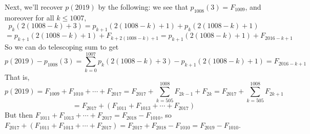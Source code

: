 \documentclass[11pt,a4paper]{article}
\newcommand{\<}{\langle}
\renewcommand{\>}{\rangle}
\begin{document}
\begin{enumerate}
	Next, we'll recover $p(2019)$ by the following: we see that $p_{1008}(3)=F_{1009}$, and moreover for all $k\le 1007$, 
	\[
	p_k(2(1008-k)+3) = p_{k+1}(2(1008-k)+1)+p_k(2(1008-k)+1)
	\]\[
	=p_{k+1}(2(1008-k)+1)+F_{k+2(1008-k)+1}
	=p_{k+1}(2(1008-k)+1)+F_{2016-k+1}
	\]
	So we can do telescoping sum to get 
	\[
	p(2019)-p_{1008}(3)
	=\sum_{k=0}^{1007} p_k(2(1008-k)+3)-p_{k+1}(2(1008-k)+1)
	=F_{2016-k+1}
	\]
	That is, 
	\[
	p(2019)=F_{1009}+F_{1010}+\cdots + F_{2017}
	=F_{2017}+\sum_{k=505}^{1008}F_{2k-1}+F_{2k}
	=F_{2017}+\sum_{k=505}^{1008}F_{2k+1}
	\]\[
	=F_{2017}+(F_{1011}+F_{1013}+\cdots + F_{2017})
	\]
	But then $F_{1011}+F_{1013}+\cdots + F_{2017}=F_{2018}-F_{1010}$, so 
	$F_{2017}+(F_{1011}+F_{1013}+\cdots + F_{2017})=F_{2017}+F_{2018}-F_{1010}=F_{2019}-F_{1010}$. 
	
\end{enumerate}
\end{document}
